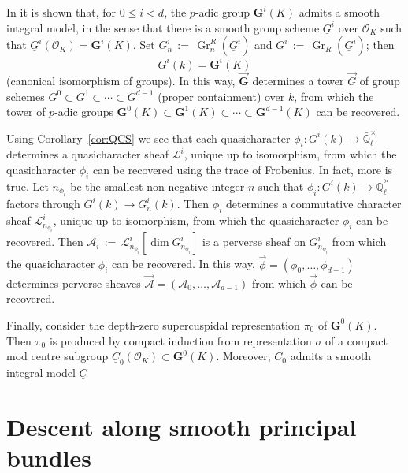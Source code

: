 \documentclass[10pt]{amsart}
\theoremstyle{plain}
\theoremstyle{definition}
\newcommand{\EE}{\mathbb{\bar Q}_\ell}
\newcommand{\OK}{\mathcal{O}_K}
\newcommand{\Fq}{k}
\newcommand{\EEx}{\EE^\times}
\newcommand{\G}{\textbf{G}}
\DeclareMathOperator{\Gr}{Gr}
\newcommand{\ceq}{{\, :=\, }}
\newcommand{\cs}[1]{{\mathcal{#1}}}
\begin{document}

In \cite{yu:03a} it is shown that, for $0 \leq i < d$, the $p$-adic group $\G^i(K)$ admits a smooth integral model, in the sense that there is a smooth group scheme $\underline{G}^i$ over $\OK$ such that $\underline{G}^i(\OK) = \G^i(K)$.
Set $G^i_n \ceq \Gr^R_n(\underline{G}^i)$ and $G^i \ceq \Gr_R(\underline{G}^i)$; 
then \[G^i(\Fq) = \G^i(K)\] (canonical isomorphism of groups).
In this way, $\vec{\G}$ determines a tower $\vec{G}$ of group schemes $G^0 \subset G^1 \subset \cdots  \subset G^{d-1}$ (proper containment) over $\Fq$, from which the tower of $p$-adic groups
$\G^0(K) \subset \G^1(K) \subset \cdots  \subset \G^{d-1}(K)$ can be recovered.

Using Corollary~\ref{cor:QCS} we see that each quasicharacter $\phi_i : G^i(\Fq) \to \EEx$ determines a quasicharacter sheaf $\cs{L}^i$, unique up to isomorphism, from which the quasicharacter $\phi_i$ can be recovered using the trace of Frobenius. 
In fact, more is true. Let $n_{\phi_i}$ be the smallest non-negative integer $n$ such that $\phi_i : G^i(\Fq) \to \EEx$ factors through $G^i(\Fq) \to G^i_n(\Fq)$.
Then $\phi_i$ determines a commutative character sheaf $\cs{L}_{n_{\phi_i}}^i$, unique up to isomorphism, from which the quasicharacter $\phi_i$ can be recovered.
Then $\cs{A}_i\ceq \cs{L}_{n_{\phi_i}}^i[\dim G_{n_{\phi_i}}^i]$ is a perverse sheaf on $G_{n_{\phi_i}}^i$ from which the quasicharacter $\phi_i$ can be recovered.
In this way,  $\vec{\phi} = (\phi_0, \ldots , \phi_{d-1})$ determines perverse sheaves $\vec{\cs{A}} = (\cs{A}_0, \ldots , \cs{A}_{d-1})$ from which $\vec{\phi}$ can be recovered. 

Finally, consider the depth-zero supercuspidal representation $\pi_0$ of $\G^0(K)$.
Then $\pi_0$ is produced by compact induction from representation $\sigma$ of a compact mod centre subgroup $\underline{C}_0(\OK) \subset \G^0(K)$. Moreover, $C_0$ admits a smooth integral model $\underline{C}$ 

\appendix

\section{Descent along smooth principal bundles}


\end{document}
